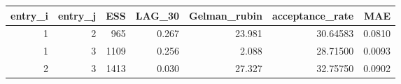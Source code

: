 \begin{longtable}{rrrrrrr}
\toprule
entry\_i & entry\_j & ESS & LAG\_30 & Gelman\_rubin & acceptance\_rate & MAE \\ 
\midrule
1 & 2 & 965 & 0.267 & 23.981 & 30.64583 & 0.0810 \\ 
1 & 3 & 1109 & 0.256 & 2.088 & 28.71500 & 0.0093 \\ 
2 & 3 & 1413 & 0.030 & 27.327 & 32.75750 & 0.0902 \\ 
\bottomrule
\end{longtable}

